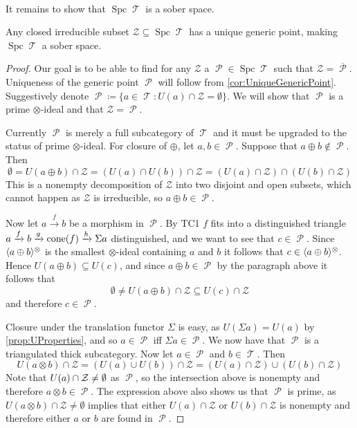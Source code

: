\documentclass[11pt]{article}
\DeclareMathOperator{\TT}{\mathcal{T}}
\DeclareMathOperator{\cP}{\mathcal{P}}
\DeclareMathOperator{\spc}{Spc}
\begin{document}
\

It remains to show that $\spc\TT$ is a sober space.

\begin{prop}
Any closed irreducible subset $\mathcal{Z} \subseteq \spc\TT$ has a unique generic point, making $\spc\TT$ a sober space.
\end{prop}
\begin{proof}
Our goal is to be able to find for any $\mathcal{Z}$ a $\cP \in \spc \TT$ such that $\mathcal{Z} = \overline{\cP}$. Uniqueness of the generic point $\cP$ will follow from \autoref{cor:UniqueGenericPoint}. Suggestively denote $\cP \coloneqq \{a \in \TT:U(a) \cap \mathcal{Z} = \emptyset\}$. We will show that $\cP$ is a prime $\otimes$-ideal and that $\mathcal{Z} = \cP$. 

Currently $\cP$ is merely a full subcategory of $\TT$ and it must be upgraded to the status of prime $\otimes$-ideal. For closure of $\oplus$, let $a,b \in \cP$. Suppose that $a \oplus b \not\in \cP$. Then 
\[
	\emptyset = U(a \oplus b) \cap \mathcal{Z} = (U(a) \cap U(b)) \cap \mathcal{Z} = (U(a) \cap \mathcal{Z}) \cap (U(b) \cap \mathcal{Z})
\] 
This is a nonempty decomposition of $\mathcal{Z}$ into two disjoint and open subsets, which cannot happen as $\mathcal{Z}$ is irreducible, so $a \oplus b \in \cP$.

Now let $a \xrightarrow{f}b$ be a morphism in $\cP$. By TC1 $f$ fits into a distinguished triangle $a \xrightarrow{f} b \xrightarrow{g} \operatorname{cone}(f) \xrightarrow{h} \Sigma a$ distinguished, and we want to see that $c \in \cP$. Since $\langle a \oplus b \rangle^{\otimes}$ is the smallest $\otimes$-ideal containing $a$ and $b$ it follows that $c \in \langle a \oplus b \rangle^{\otimes}$. Hence $U(a \oplus b) \subseteq U(c)$, and since $a \oplus b \in \cP$ by the paragraph above it follows that
\[
	\emptyset \not = U(a \oplus b) \cap \mathcal{Z} \subseteq U(c) \cap \mathcal{Z}
\]
and therefore $c \in \cP$.

Closure under the translation functor $\Sigma$ is easy, as $U(\Sigma a) = U(a)$ by \autoref{prop:UProperties}, and so $a \in \cP$ iff $\Sigma a \in \cP$. We now have that $\cP$ is a triangulated thick subcategory. Now let $a \in \cP$ and $b \in \TT$. Then
\[
	U(a \otimes b) \cap \mathcal{Z} = (U(a) \cup U(b)) \cap \mathcal{Z} = (U(a) \cap \mathcal{Z}) \cup (U(b) \cap \mathcal{Z})
\]
Note that $U(a) \cap \mathcal Z \not = \emptyset$ as $\cP$, so the intersection above is nonempty and therefore $a \otimes b \in \cP$. The expression above also shows us that $\cP$ is prime, as $U(a \otimes b) \cap \mathcal{Z} \not = \emptyset$ implies that either $U(a) \cap \mathcal{Z}$ or $U(b) \cap \mathcal{Z}$ is nonempty and therefore either $a$ or $b$ are found in $\cP$.


\end{proof}
\end{document}
